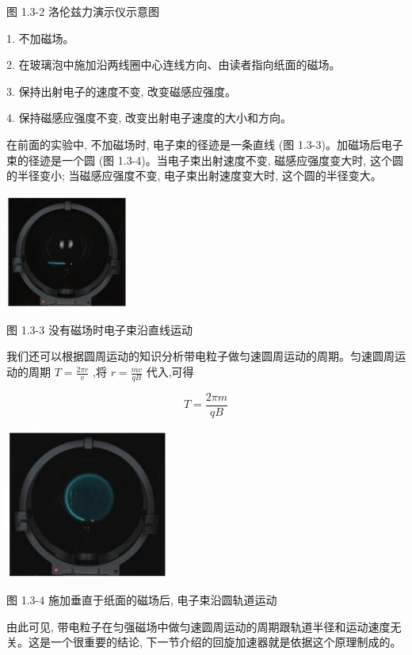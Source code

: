 \documentclass[10pt]{article}
\begin{document}
图 1.3-2 洛伦兹力演示仪示意图

1. 不加磁场。

2. 在玻璃泡中施加沿两线圈中心连线方向、由读者指向纸面的磁场。

3. 保持出射电子的速度不变, 改变磁感应强度。

4. 保持磁感应强度不变, 改变出射电子速度的大小和方向。

在前面的实验中, 不加磁场时, 电子束的径迹是一条直线 (图 1.3-3)。加磁场后电子束的径迹是一个圆 (图 1.3-4)。当电子束出射速度不变, 磁感应强度变大时, 这个圆的半径变小; 当磁感应强度不变, 电子束出射速度变大时, 这个圆的半径变大。

\begin{center}
\includegraphics[max width=0.3\textwidth]{images/01910e72-c5b7-7ed5-a6d4-fb3a5faefc32_20_973485.jpg}
\end{center}

图 1.3-3 没有磁场时电子束沿直线运动

我们还可以根据圆周运动的知识分析带电粒子做匀速圆周运动的周期。匀速圆周运动的周期 \(T = \frac{2\pi r}{v}\) ,将 \(r = \frac{mv}{qB}\) 代入,可得

\[
T = \frac{2\pi m}{qB}
\]

\begin{center}
\includegraphics[max width=0.4\textwidth]{images/01910e72-c5b7-7ed5-a6d4-fb3a5faefc32_20_512596.jpg}
\end{center}

图 1.3-4 施加垂直于纸面的磁场后, 电子束沿圆轨道运动

由此可见, 带电粒子在匀强磁场中做匀速圆周运动的周期跟轨道半径和运动速度无关。这是一个很重要的结论, 下一节介绍的回旋加速器就是依据这个原理制成的。
\end{document}

